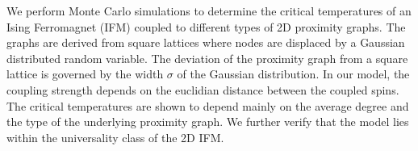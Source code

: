 We perform Monte Carlo simulations to determine the critical temperatures
of an Ising Ferromagnet (IFM) coupled to different types of 2D proximity
graphs.
The graphs are derived from square lattices where nodes are displaced by
a Gaussian distributed random variable.
The deviation of the proximity graph from a square lattice is
governed by the width \(\sigma\) of the Gaussian distribution.
In our model, the coupling strength depends on the euclidian distance
between the coupled spins.
The critical temperatures are shown to depend mainly on the average degree
and the type of the underlying proximity graph.
We further verify that the model lies within the universality class of
the 2D IFM.
